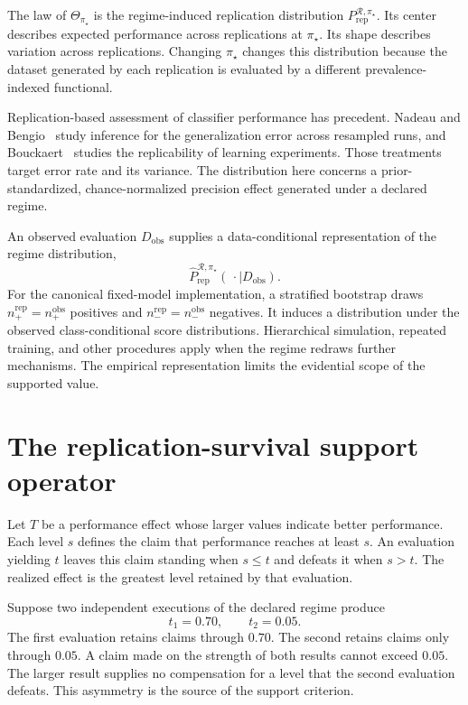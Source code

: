 \documentclass[11pt]{article}
\newcommand{\Regime}{\mathcal{R}}
\newcommand{\PRep}{P_{\mathrm{rep}}^{\Regime,\pi_\star}}
\newcommand{\PRepHat}{\widehat{P}_{\mathrm{rep}}^{\Regime,\pi_\star}}
\theoremstyle{remark}
\begin{document}
The law of $\Theta_{\pi_\star}$ is the regime-induced replication distribution $\PRep$. Its center describes expected performance across replications at $\pi_\star$. Its shape describes variation across replications. Changing $\pi_\star$ changes this distribution because the dataset generated by each replication is evaluated by a different prevalence-indexed functional.

Replication-based assessment of classifier performance has precedent. Nadeau and Bengio~\cite{nadeau2003inference} study inference for the generalization error across resampled runs, and Bouckaert~\cite{bouckaert2004estimating} studies the replicability of learning experiments. Those treatments target error rate and its variance. The distribution here concerns a prior-standardized, chance-normalized precision effect generated under a declared regime.

An observed evaluation $D_{\mathrm{obs}}$ supplies a data-conditional representation of the regime distribution,
\[
\PRepHat(\,\cdot\mid D_{\mathrm{obs}}).
\]
For the canonical fixed-model implementation, a stratified bootstrap draws $n_+^{\mathrm{rep}}=n_+^{\mathrm{obs}}$ positives and $n_-^{\mathrm{rep}}=n_-^{\mathrm{obs}}$ negatives. It induces a distribution under the observed class-conditional score distributions. Hierarchical simulation, repeated training, and other procedures apply when the regime redraws further mechanisms. The empirical representation limits the evidential scope of the supported value.

\section{The replication-survival support operator}
\label{sec:support}

Let $T$ be a performance effect whose larger values indicate better performance. Each level $s$ defines the claim that performance reaches at least $s$. An evaluation yielding $t$ leaves this claim standing when $s\leq t$ and defeats it when $s>t$. The realized effect is the greatest level retained by that evaluation.

Suppose two independent executions of the declared regime produce
\[
t_1=0.70,
\qquad
t_2=0.05.
\]
The first evaluation retains claims through $0.70$. The second retains claims only through $0.05$. A claim made on the strength of both results cannot exceed $0.05$. The larger result supplies no compensation for a level that the second evaluation defeats. This asymmetry is the source of the support criterion.
\end{document}
